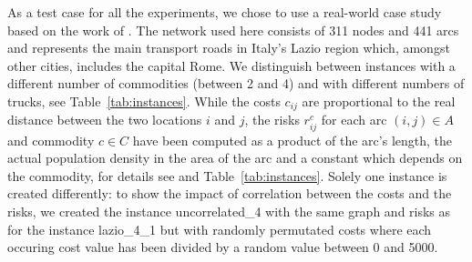\documentclass[preprint,12pt]{elsarticle}
\begin{document}
As a test case for all the experiments, we chose to use a real-world case study based on the work of \citet{bcg2009a}. The network used here consists of 311 nodes and 441 arcs and represents the main transport roads in Italy's Lazio region which, amongst other cities, includes the capital Rome. We distinguish between instances with a different number of commodities (between 2 and 4) and with different numbers of trucks, see Table~\ref{tab:instances}. While the costs $c_{ij}$ are proportional to the real distance between the two locations $i$ and $j$, the risks $r_{ij}^c$ for each arc $(i,j) \in A$ and commodity $c \in C$ have been computed as a product of the arc's length, the actual population density in the area of the arc and a constant which depends on the commodity, for details see \citep{bcg2009a} and Table~\ref{tab:instances}. Solely one instance is created differently: to show the impact of correlation between the costs and the risks, we created the instance uncorrelated\_4 with the same graph and risks as for the instance lazio\_4\_1 but with randomly permutated costs where each occuring cost value has been divided by a random value between 0 and 5000.
\end{document}
